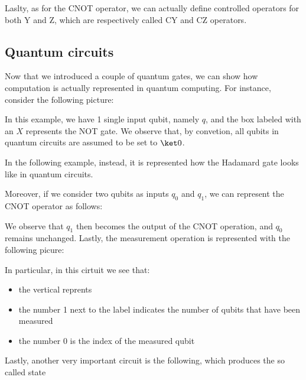 \documentclass[a4paper, 12pt]{report}
\begin{document}
Laslty, as for the CNOT operator, we can actually define controlled operators for both Y and Z, which are respectively called CY and CZ operators.

\subsection{Quantum circuits}

Now that we introduced a couple of quantum gates, we can show how computation is actually represented in quantum computing. For instance, consider the following picture:


In this example, we have 1 single input qubit, namely $q$, and the box labeled with an $X$ represents the NOT gate. We observe that, by convetion, all qubits in quantum circuits are assumed to be set to $\ket 0$.

In the following example, instead, it is represented how the Hadamard gate looks like in quantum circuits.


Moreover, if we consider two qubits as inputs $q_0$ and $q_1$, we can represent the CNOT operator as follows:


We observe that $q_1$ then becomes the output of the CNOT operation, and $q_0$ remains unchanged. Lastly, the measurement operation is represented with the following picure:


In particular, in this cirtuit we see that:

\begin{itemize}
	\item the vertical  reprents 
	\item the number 1 next to the label  indicates the number of qubits that have been measured
	\item the number 0 is the index of the measured qubit
\end{itemize}


Lastly, another very important circuit is the following, which produces the so called  state
\end{document}
